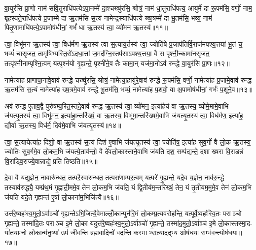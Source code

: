 {\anuvakamend[{उ॒ग्रा ए॒त्याप॒स्त्रीणि॑ च॥४॥}]}

वा॒युर॑सि प्रा॒णो नाम॑ सवि॒तुराधि॑पत्येऽपा॒नम्मे॑ दा॒श्चख्षु॑रसि॒ श्रोत्रं॒ नाम॑ धा॒तुराधि॑पत्य॒ आयु॑र्मे दा रू॒पम॑सि॒ वर्णो॒ नाम॒ बृह॒स्पते॒राधि॑पत्ये प्र॒जाम्मे॑ दा ऋ॒तम॑सि स॒त्यं नामेन्द्र॒स्याधि॑पत्ये ख्ष॒त्रम्मे॑ दा भू॒तम॑सि॒ भव्यं॒ नाम॑ पितृ॒णामाधि॑पत्ये॒ऽपामोष॑धीनां॒ गर्भं॑ धा ऋ॒तस्य॑ त्वा॒ व्यो॑मन ऋ॒तस्य॑॥११॥

त्वा॒ विभू॑मन ऋ॒तस्य॑ त्वा॒ विध॑र्मण ऋ॒तस्य॑ त्वा स॒त्याय॒र्तस्य॑ त्वा॒ ज्योति॑षे प्र॒जाप॑तिर्वि॒राज॑मपश्य॒त्तया॑ भू॒तं च॒ भव्यं॑ चासृजत॒ तामृषि॑भ्यस्ति॒रो॑ऽदधा॒त्तां ज॒मद॑ग्नि॒स्तप॑साऽपश्य॒त्तया॒ वै स पृश्नी॒न्कामा॑नसृजत॒ तत्पृ॑श्नीनाम्पृश्नि॒त्वम् यत्पृश्न॑यो गृ॒ह्यन्ते॒ पृश्नी॑ने॒व तैः कामा॒न् यज॑मा॒नोऽव॑ रुन्द्धे वा॒युर॑सि प्रा॒णः॥१२॥

नामेत्या॑ह प्राणापा॒नावे॒वाव॑ रुन्द्धे॒ चख्षु॑रसि॒ श्रोत्रं॒ नामेत्या॒हायु॑रे॒वाव॑ रुन्द्धे रू॒पम॑सि॒ वर्णो॒ नामेत्या॑ह प्र॒जामे॒वाव॑ रुन्द्ध ऋ॒तम॑सि स॒त्यं नामेत्या॑ह ख्ष॒त्रमे॒वाव॑ रुन्द्धे भू॒तम॑सि॒ भव्यं॒ नामेत्या॑ह प॒शवो॒ वा अ॒पामोष॑धीनां॒ गर्भः॑ प॒शूने॒व॥१३॥

अव॑ रुन्द्ध ए॒ताव॒द्वै पुरु॑षम्प॒रित॒स्तदे॒वाव॑ रुन्द्ध ऋ॒तस्य॑ त्वा॒ व्यो॑मन॒ इत्या॑हे॒यं वा ऋ॒तस्य॒ व्यो॑मे॒मामे॒वाभि ज॑यत्यृ॒तस्य॑ त्वा॒ विभू॑मन॒ इत्या॑हा॒न्तरि॑ख्षं॒ वा ऋ॒तस्य॒ विभू॑मा॒न्तरि॑ख्षमे॒वाभि ज॑यत्यृ॒तस्य॑ त्वा॒ विध॑र्मण॒ इत्या॑ह॒ द्यौर्वा ऋ॒तस्य॒ विध॑र्म॒ दिव॑मे॒वाभि ज॑यत्यृ॒तस्य॑॥१४॥

त्वा॒ स॒त्यायेत्या॑ह॒ दिशो॒ वा ऋ॒तस्य॑ स॒त्यं दिश॑ ए॒वाभि ज॑यत्यृ॒तस्य॑ त्वा॒ ज्योति॑ष॒ इत्या॑ह सुव॒र्गो वै लो॒क ऋ॒तस्य॒ ज्योतिः॑ सुव॒र्गमे॒व लो॒कम॒भि ज॑यत्ये॒ताव॑न्तो॒ वै दे॑वलो॒कास्ताने॒वाभि ज॑यति दश॒ सम्प॑द्यन्ते॒ दशाख्षरा वि॒राडन्नं॑ वि॒राड्वि॒राज्ये॒वान्नाद्ये॒ प्रति॑ तिष्ठति॥१५॥

{\anuvakamend[{व्यो॑मन ऋ॒तस्य॑ प्रा॒णः प॒शूने॒व विध॑र्म॒ दिव॑मे॒वाभि ज॑यत्यृ॒तस्य॒ षट्च॑त्वारिशच्च॥५॥}]}

दे॒वा वै यद्य॒ज्ञेन॒ नावारु॑न्धत॒ तत्परै॒रवा॑रुन्धत॒ तत्परा॑णाम्पर॒त्वम् यत्परे॑ गृ॒ह्यन्ते॒ यदे॒व य॒ज्ञेन॒ नाव॑रु॒न्द्धे तस्याव॑रुद्ध्यै॒ यम्प्र॑थ॒मं गृ॒ह्णाती॒ममे॒व तेन॑ लो॒कम॒भि ज॑यति॒ यं द्वि॒तीय॑म॒न्तरि॑ख्षं॒ तेन॒ यं तृ॒तीय॑म॒मुमे॒व तेन॑ लो॒कम॒भि ज॑यति यदे॒ते गृ॒ह्यन्त॑ ए॒षां लो॒काना॑म॒भिजि॑त्यै॥१६॥

उत्त॑रे॒ष्वहः॑स्व॒मुतो॒ऽर्वाञ्चो॑ गृह्यन्तेऽभि॒जित्यै॒वेमाल्लोँ॒कान्पुन॑रि॒मं लो॒कम्प्र॒त्यव॑रोहन्ति॒ यत्पूर्वे॒ष्वहः॑स्वि॒तः पराञ्चो गृ॒ह्यन्ते॒ तस्मा॑दि॒तः पराञ्च इ॒मे लो॒का यदुत्त॑रे॒ष्वहः॑स्व॒मुतो॒ऽर्वाञ्चो॑ गृ॒ह्यन्ते॒ तस्मा॑द॒मुतो॒ऽर्वाञ्च॑ इ॒मे लो॒कास्तस्मा॒द- या॑तयाम्नो लो॒कान्म॑नु॒ष्या॑ उप॑ जीवन्ति ब्रह्मवा॒दिनो॑ वदन्ति॒ कस्माथ्स॒त्याद॒द्भ्य ओष॑धयः॒ सम्भ॑व॒न्त्योष॑धयः॥१७॥

